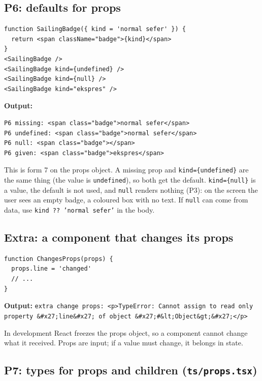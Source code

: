 \documentclass[
  10pt,
]{article}
\begin{document}
\hypertarget{p6-defaults-for-props}{%
\subsection{P6: defaults for props}\label{p6-defaults-for-props}}

\begin{verbatim}
function SailingBadge({ kind = 'normal sefer' }) {
  return <span className="badge">{kind}</span>
}
<SailingBadge />
<SailingBadge kind={undefined} />
<SailingBadge kind={null} />
<SailingBadge kind="ekspres" />
\end{verbatim}

\textbf{Output:}

\begin{verbatim}
P6 missing: <span class="badge">normal sefer</span>
P6 undefined: <span class="badge">normal sefer</span>
P6 null: <span class="badge"></span>
P6 given: <span class="badge">ekspres</span>
\end{verbatim}

This is form 7 on the props object. A missing prop and
\texttt{kind=\allowbreak{}\{undefined\}} are the same thing (the value
is \texttt{undefined}), so both get the default.
\texttt{kind=\allowbreak{}\{null\}} is a value, the default is not used,
and \texttt{null} renders nothing (P3): on the screen the user sees an
empty badge, a coloured box with no text. If \texttt{null} can come from
data, use \texttt{kind ?? 'normal sefer'} in the body.

\hypertarget{extra-a-component-that-changes-its-props}{%
\subsection{Extra: a component that changes its
props}\label{extra-a-component-that-changes-its-props}}

\begin{verbatim}
function ChangesProps(props) {
  props.line = 'changed'
  // ...
}
\end{verbatim}

\textbf{Output:}
\texttt{extra change props:\allowbreak{} <p>TypeError:\allowbreak{} Cannot assign to read only property \&\#x27;line\&\#x27; of object \&\#x27;\#\&lt;Object\&gt;\&\#x27;</\allowbreak{}p>}

In development React freezes the props object, so a component cannot
change what it received. Props are input; if a value must change, it
belongs in state.

\hypertarget{p7-types-for-props-and-children-tspropstsx}{%
\subsection{\texorpdfstring{P7: types for props and children
(\texttt{ts/\allowbreak{}props.\allowbreak{}tsx})}{P7: types for props and children ()}}\label{p7-types-for-props-and-children-tspropstsx}}
\end{document}
